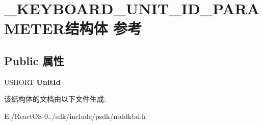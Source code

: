 \hypertarget{struct___k_e_y_b_o_a_r_d___u_n_i_t___i_d___p_a_r_a_m_e_t_e_r}{}\section{\+\_\+\+K\+E\+Y\+B\+O\+A\+R\+D\+\_\+\+U\+N\+I\+T\+\_\+\+I\+D\+\_\+\+P\+A\+R\+A\+M\+E\+T\+E\+R结构体 参考}
\label{struct___k_e_y_b_o_a_r_d___u_n_i_t___i_d___p_a_r_a_m_e_t_e_r}
\subsection*{Public 属性}
\begin{DoxyCompactItemize}
\item 
\mbox{\label{struct___k_e_y_b_o_a_r_d___u_n_i_t___i_d___p_a_r_a_m_e_t_e_r_a6edebd8347f7bd78cd5ccfc7ac8f7526}} 
U\+S\+H\+O\+RT {\bfseries Unit\+Id}
\end{DoxyCompactItemize}


该结构体的文档由以下文件生成\+:\begin{DoxyCompactItemize}
\item 
E\+:/\+React\+O\+S-\/0../sdk/include/psdk/ntddkbd.\+h\end{DoxyCompactItemize}
